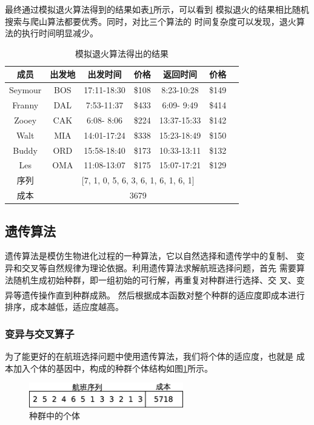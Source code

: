 \documentclass[fontset=fandol,a4paper,zihao=5]{ctexart}
\newcommand{\upcite}[1]{\textsuperscript{\textsuperscript{\cite{#1}}}}
\begin{document}
			最终通过模拟退火算法得到的结果如表\ref{tab:annealing}所示，可以看到
            模拟退火的结果相比随机搜索与爬山算法都要优秀。同时，对比三个算法的
            时间复杂度可以发现，退火算法的执行时间明显减少。
			\begin{table}[!htbp]
				\centering
				\caption{模拟退火算法得出的结果}
				\label{tab:annealing}
				\begin{tabular}{ccccccc}
					\toprule[1pt]
					成员     & 出发地& 出发时间    &  价格  &  返回时间    &   价格 \\
					\midrule
					Seymour  &      BOS & 17:11-18:30 & \$108 &  8:23-10:28 & \$149 \\
					Franny   &   DAL  & 7:53-11:37 & \$433  & 6:09- 9:49 & \$414 \\
					Zooey    &   CAK  & 6:08- 8:06 & \$224 & 13:37-15:33 & \$142 \\
					Walt     &  MIA & 14:01-17:24 & \$338 & 15:23-18:49 & \$150 \\
					Buddy    &   ORD & 15:58-18:40 & \$173 & 10:33-13:11 & \$132 \\
					Les      & OMA  & 11:08-13:07 & \$175 & 15:07-17:21 & \$129 \\
					\midrule
					序列    & \multicolumn{5}{c}{[7, 1, 0, 5, 6, 3, 6, 1, 6, 1, 6, 1]} \\
					成本    & \multicolumn{5}{c}{3679} \\
					\bottomrule[1pt]
				\end{tabular} 
			\end{table}
		\subsection{遗传算法}
			遗传算法是模仿生物进化过程的一种算法，它以自然选择和遗传学中的复制、
            变异和交叉等自然规律为理论依据。利用遗传算法求解航班选择问题，首先
            需要算法随机生成初始种群，即一组初始的可行解，再重复对种群进行选择、交
			叉、变异等遗传操作直到种群成熟\upcite{赵静2008数学建模与数学实验}。
            然后根据成本函数对整个种群的适应度即成本进行排序，成本越低，适应度越高。
			
			
			\subsubsection{变异与交叉算子}
			\label{sec:ag_cal}
			为了能更好的在航班选择问题中使用遗传算法，我们将个体的适应度，也就是
            成本加入个体的基因中，构成的种群个体结构如图\ref{fig:life}所示。
			\begin{figure}[htbp]
				\centering
				\includegraphics[width=0.6\textwidth]{pic/life_struct.eps}
				\caption{种群中的个体}
				\label{fig:life}
			\end{figure}
		
\end{document}
